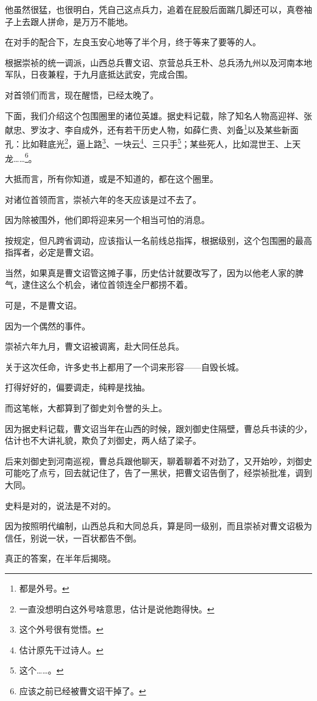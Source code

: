 \begin{multicols}{\theparacolNo}
		他虽然很猛，也很明白，凭自己这点兵力，追着在屁股后面踹几脚还可以，真卷袖子上去跟人拼命，是万万不能地。

		在对手的配合下，左良玉安心地等了半个月，终于等来了要等的人。

		根据崇祯的统一调派，山西总兵曹文诏、京营总兵王朴、总兵汤九州以及河南本地军队，日夜兼程，于九月底抵达武安，完成合围。

		对首领们而言，现在醒悟，已经太晚了。

		下面，我们介绍这个包围圈里的诸位英雄。据史料记载，除了知名人物高迎祥、张献忠、罗汝才、李自成外，还有若干历史人物，如薛仁贵、刘备\footnote{都是外号。}以及某些新面孔：比如鞋底光\footnote{一直没想明白这外号啥意思，估计是说他跑得快。}，逼上路\footnote{这个外号很有觉悟。}、一块云\footnote{估计原先干过诗人。}、三只手\footnote{这个……。}；某些死人，比如混世王、上天龙……\footnote{应该之前已经被曹文诏干掉了。}。

		大抵而言，所有你知道，或是不知道的，都在这个圈里。

		对诸位首领而言，崇祯六年的冬天应该是过不去了。

		因为除被围外，他们即将迎来另一个相当可怕的消息。

		按规定，但凡跨省调动，应该指认一名前线总指挥，根据级别，这个包围圈的最高指挥者，必定是曹文诏。

		当然，如果真是曹文诏管这摊子事，历史估计就要改写了，因为以他老人家的脾气，逮住这么个机会，诸位首领连全尸都捞不着。

		可是，不是曹文诏。

		因为一个偶然的事件。

		崇祯六年九月，曹文诏被调离，赴大同任总兵。

		关于这次任命，许多史书上都用了一个词来形容——自毁长城。

		打得好好的，偏要调走，纯粹是找抽。

		而这笔帐，大都算到了御史刘令誉的头上。

		因为据史料记载，曹文诏当年在山西的时候，跟刘御史住隔壁，曹总兵书读的少，估计也不大讲礼貌，欺负了刘御史，两人结了梁子。

		后来刘御史到河南巡视，曹总兵跟他聊天，聊着聊着不对劲了，又开始吵，刘御史可能吃了点亏，回去就记住了，告了一黑状，把曹文诏告倒了，经崇祯批准，调到大同。

		史料是对的，说法是不对的。

		因为按照明代编制，山西总兵和大同总兵，算是同一级别，而且崇祯对曹文诏极为信任，别说一状，一百状都告不倒。

		真正的答案，在半年后揭晓。


\end{multicols}
